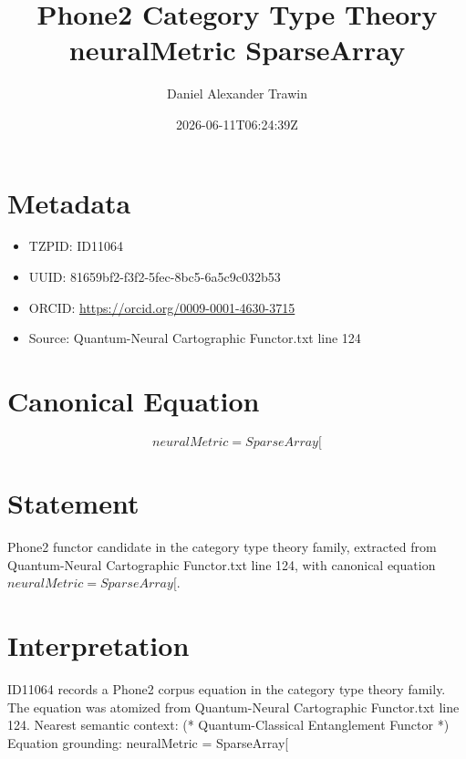 \documentclass[11pt]{article}
\title{Phone2 Category Type Theory neuralMetric SparseArray}
\author{Daniel Alexander Trawin}
\date{2026-06-11T06:24:39Z}
\begin{document}
\maketitle
\section*{Metadata}
\begin{itemize}
\item TZPID: ID11064
\item UUID: 81659bf2-f3f2-5fec-8bc5-6a5c9c032b53
\item ORCID: \url{https://orcid.org/0009-0001-4630-3715}
\item Source: Quantum-Neural Cartographic Functor.txt line 124
\end{itemize}
\section*{Canonical Equation}
\[
neuralMetric = SparseArray[
\]
\section*{Statement}
Phone2 functor candidate in the category type theory family, extracted from Quantum-Neural Cartographic Functor.txt line 124, with canonical equation $neuralMetric = SparseArray[$.
\section*{Interpretation}
ID11064 records a Phone2 corpus equation in the category type theory family. The equation was atomized from Quantum-Neural Cartographic Functor.txt line 124. Nearest semantic context: (* Quantum-Classical Entanglement Functor *) Equation grounding: neuralMetric = SparseArray[
\end{document}
